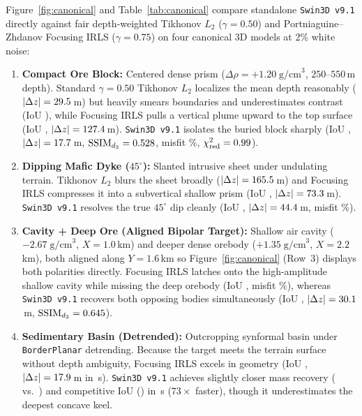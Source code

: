\documentclass[11pt,a4paper]{article}
\begin{document}
Figure~\ref{fig:canonical} and Table~\ref{tab:canonical} compare standalone \texttt{Swin3D v9.1} directly against fair depth-weighted Tikhonov $L_2$ ($\gamma=0.50$) and Portniaguine--Zhdanov Focusing IRLS ($\gamma=0.75$) on four canonical 3D models at 2\% white noise:
\begin{enumerate}[leftmargin=1.4em,itemsep=0.25em]
  \item \textbf{Compact Ore Block:} Centered dense prism ($\Delta\rho = +1.20\;\text{g/cm}^3$, $250\text{--}550$\,m depth). Standard $\gamma=0.50$ Tikhonov $L_2$ localizes the mean depth reasonably ($|\Delta z| = 29.5{}$\,m) but heavily smears boundaries and underestimates contrast (IoU \valCanonTikOreIoU{}), while Focusing IRLS pulls a vertical plume upward to the top surface (IoU \valCanonFocOreIoU{}, $|\Delta z| = 127.4{}$\,m). \texttt{Swin3D v9.1} isolates the buried block sharply (IoU \valCanonSwinOreIoU{}, $|\Delta z| = 17.7{}$\,m, $\text{SSIM}_{d_3} = 0.528{}$, misfit \valCanonSwinOreMisfit{}\%, $\chi^2_{\mathrm{red}} = 0.99{}$).
  \item \textbf{Dipping Mafic Dyke ($45^\circ$):} Slanted intrusive sheet under undulating terrain. Tikhonov $L_2$ blurs the sheet broadly ($|\Delta z| = 165.5{}$\,m) and Focusing IRLS compresses it into a subvertical shallow prism (IoU \valCanonFocDykeIoU{}, $|\Delta z| = 73.3{}$\,m). \texttt{Swin3D v9.1} resolves the true $45^\circ$ dip cleanly (IoU \valCanonSwinDykeIoU{}, $|\Delta z| = 44.4{}$\,m, misfit \valCanonSwinDykeMisfit{}\%).
  \item \textbf{Cavity + Deep Ore (Aligned Bipolar Target):} Shallow air cavity ($-2.67\;\text{g/cm}^3$, $X=1.0$\,km) and deeper dense orebody ($+1.35\;\text{g/cm}^3$, $X=2.2$\,km), both aligned along $Y=1.6$\,km so Figure~\ref{fig:canonical} (Row~3) displays both polarities directly. Focusing IRLS latches onto the high-amplitude shallow cavity while missing the deep orebody (IoU \valCanonFocTwinIoU{}, misfit \valCanonFocTwinMisfit{}\%), whereas \texttt{Swin3D v9.1} recovers both opposing bodies simultaneously (IoU \valCanonSwinTwinIoU{}, $|\Delta z| = 30.1{}$\,m, $\text{SSIM}_{d_3} = 0.645{}$).
  \item \textbf{Sedimentary Basin (Detrended):} Outcropping synformal basin under \texttt{BorderPlanar} detrending. Because the target meets the terrain surface without depth ambiguity, Focusing IRLS excels in geometry (IoU \valCanonFocBasinIoU{}, $|\Delta z| = 17.9{}$\,m in \valCanonFocBasinTime{}\,s). \texttt{Swin3D v9.1} achieves slightly closer mass recovery (\valCanonSwinBasinAmp{} vs.\ \valCanonFocBasinAmp{}) and competitive IoU (\valCanonSwinBasinIoU{}) in \valCanonSwinBasinTime{}\,s ($73\times$ faster), though it underestimates the deepest concave keel.
\end{enumerate}
\end{document}
